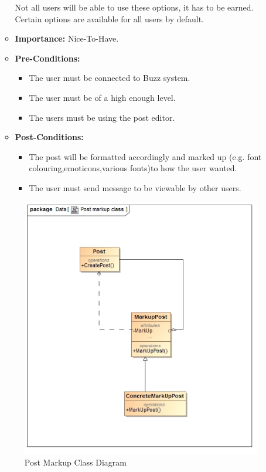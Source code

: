 \documentclass[11pt]{article}
\begin{document}
\begin{enumerate}
\begin{itemize}
Not all users will be able to use these options, it has to be earned. Certain options are available for all users by default.

 
\item\textbf{Importance:} Nice-To-Have.

 
\item\textbf{Pre-Conditions: }
	\begin{itemize}
		\item The user must be connected to Buzz system.
		\item The user must be of a high enough level.
		\item The users must be using the post editor.
	\end{itemize}
 

\item\textbf{Post-Conditions: }
	\begin{itemize}

		\item The post will be formatted accordingly and marked up (e.g. font colouring,emoticons,various fonts)to how the user wanted. 
		\item The user must send message to be viewable by other users.
	\end{itemize}
\end{itemize}
\graphicspath{ {../Diagrams/Matt/Class/} }
	  \begin{figure}[H]	
    	\includegraphics[scale=0.5,center]{PostmarkupClass.jpg}
    	\caption{Post Markup Class Diagram}
	\end{figure}


\end{enumerate}
\end{document}
